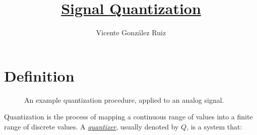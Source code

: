 
\title{\href{https://github.com/vicente-gonzalez-ruiz/signal_quantization}{Signal Quantization}}

\author{Vicente González Ruiz}

\maketitle
\tableofcontents

\section{Definition}

\begin{figure}
  \caption{An example quantization procedure, applied to an analog
    signal.}
  \label{fig:cuantif}
\end{figure}

Quantization is the process of mapping a continuous range of values
into a finite range of discrete values. A
\href{https://en.wikipedia.org/wiki/Quantization_(signal_processing)}{\emph{quantizer}},
usually denoted by $Q$, is a system that:


